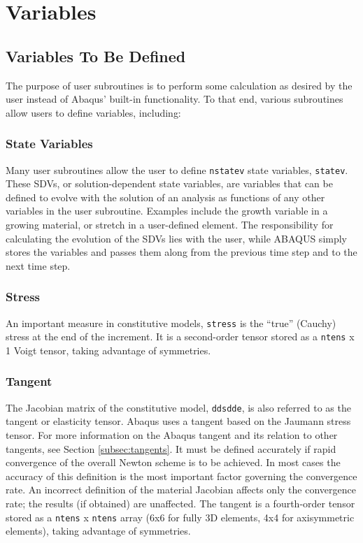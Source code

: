 \documentclass[10pt,letterpaper,oneside]{report}
\begin{document}

\section{Variables}

\subsection{Variables To Be Defined}
The purpose of user subroutines is to perform some calculation as desired by the user instead of Abaqus' built-in functionality.  To that end, various subroutines allow users to define variables, including: 

\subsubsection{State Variables}
Many user subroutines allow the user to define \texttt{nstatev} state variables, \texttt{statev}.  These SDVs, or solution-dependent state variables, are variables that can be defined to evolve with the solution of an analysis as functions of any other variables in the user subroutine.  Examples include the growth variable in a growing material, or stretch in a user-defined element.  The responsibility for calculating the evolution of the SDVs lies with the user, while ABAQUS simply stores the variables and passes them along from the previous time step and to the next time step.  

\subsubsection{Stress}
An important measure in constitutive models, \texttt{stress} is the “true” (Cauchy) stress at the end of the increment.  It is a second-order tensor stored as a \texttt{ntens} x 1 Voigt tensor, taking advantage of symmetries.

\subsubsection{Tangent}
The Jacobian matrix of the constitutive model, \texttt{ddsdde}, is also referred to as the tangent or elasticity tensor.  Abaqus uses a tangent based on the Jaumann stress tensor.  For more information on the Abaqus tangent and its relation to other tangents, see Section \ref{subsec:tangents}.  It must be defined accurately if rapid convergence of the overall Newton scheme is to be achieved. In most cases the accuracy of this definition is the most important factor governing the convergence rate. An incorrect definition of the material Jacobian affects only the convergence rate; the results (if obtained) are unaffected.  The tangent is a fourth-order tensor stored as a \texttt{ntens} x \texttt{ntens} array (6x6 for fully 3D elements, 4x4 for axisymmetric elements), taking advantage of symmetries.  
\end{document}
